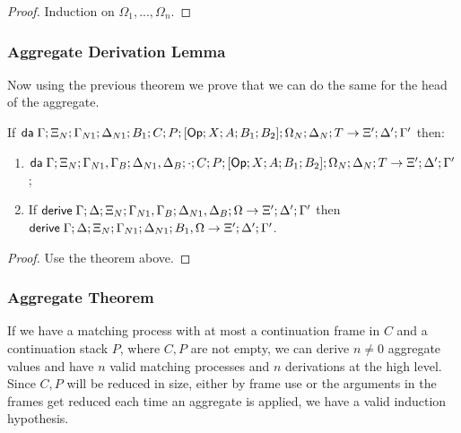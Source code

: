 \begin{proof}
   Induction on $\Omega_1, ..., \Omega_n$.
\end{proof}

\subsubsection{Aggregate Derivation Lemma}

Now using the previous theorem we prove that we can do the same for the head of the aggregate.

\begin{theorem}
   If $\mathsf{da} \; \Gamma; \Xi_N; \Gamma_{N1}; \Delta_{N1}; B_1; C; P; [\mathsf{Op} ; X ; A ; B_1; B_2]; \Omega_N; \Delta_N; T \rightarrow \Xi'; \Delta'; \Gamma'$ then:
   
   \begin{enumerate}
      \item $\mathsf{da} \; \Gamma; \Xi_N; \Gamma_{N1}, \Gamma_B; \Delta_{N1}, \Delta_B; \cdot; C; P; [\mathsf{Op} ; X ; A ; B_1; B_2]; \Omega_N; \Delta_N; T \rightarrow \Xi'; \Delta'; \Gamma'$;
      \item If $\mathsf{derive} \; \Gamma; \Delta; \Xi_N; \Gamma_{N1}, \Gamma_B; \Delta_{N1}, \Delta_B; \Omega \rightarrow \Xi'; \Delta'; \Gamma'$ then $\mathsf{derive} \; \Gamma; \Delta; \Xi_N; \Gamma_{N1}; \Delta_{N1}; B_1, \Omega \rightarrow \Xi'; \Delta'; \Gamma'$.
   \end{enumerate}
\end{theorem}

\begin{proof}
   Use the theorem above.
\end{proof}

\subsubsection{Aggregate Theorem}

If we have a matching process with at most a continuation frame in $C$ and a continuation stack $P$, where $C, P$ are not empty, we can derive $n \neq 0$ aggregate values and have $n$ valid matching processes and $n$ derivations at the high level. Since $C, P$ will be reduced in size, either by frame use or the arguments in the frames get reduced each time an aggregate is applied, we have a valid induction hypothesis.


